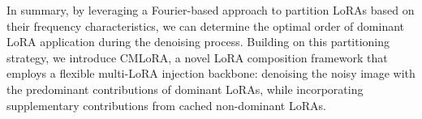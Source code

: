 In summary, by leveraging a Fourier-based approach to partition LoRAs based on their frequency characteristics, we can determine the optimal order of dominant LoRA application during the denoising process. Building on this partitioning strategy, we introduce CMLoRA, a novel LoRA composition framework that employs a flexible multi-LoRA injection backbone: denoising the noisy image with the predominant contributions of dominant LoRAs, while incorporating supplementary contributions from cached non-dominant LoRAs.